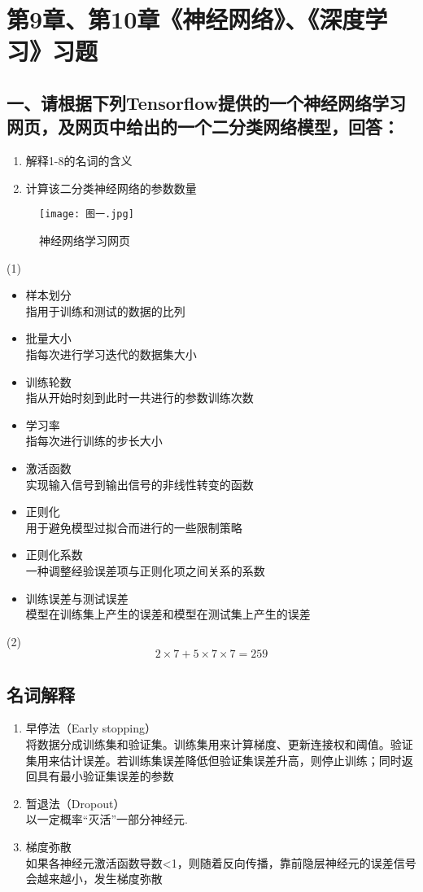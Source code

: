 \documentclass{ctexart}
\begin{document}
\section*{第9章、第10章《神经网络》、《深度学习》习题}
\subsection*{一、请根据下列Tensorflow提供的一个神经网络学习网页，及网页中给出的一个二分类网络模型，回答：}
\begin{enumerate}[(1)]
\item 解释1-8的名词的含义
\item 计算该二分类神经网络的参数数量
\end{enumerate}

\begin{figure}[H]
\centerline{\texttt{[image: 图一.jpg]}}
\caption{神经网络学习网页}
\end{figure}

(1)
\begin{itemize}
\item 样本划分\\
指用于训练和测试的数据的比列
\item 批量大小\\
指每次进行学习迭代的数据集大小
\item 训练轮数\\
指从开始时刻到此时一共进行的参数训练次数
\item 学习率\\
指每次进行训练的步长大小
\item 激活函数\\
实现输入信号到输出信号的非线性转变的函数
\item 正则化\\
用于避免模型过拟合而进行的一些限制策略
\item 正则化系数\\
一种调整经验误差项与正则化项之间关系的系数
\item 训练误差与测试误差\\
模型在训练集上产生的误差和模型在测试集上产生的误差
\end{itemize}
(2)
\begin{equation*}
2\times7+5\times7\times7=259
\end{equation*}


\subsection*{名词解释}
\begin{enumerate}[(1)]
\item 早停法（Early stopping）\\
将数据分成训练集和验证集。训练集用来计算梯度、更新连接权和阈值。验证集用来估计误差。若训练集误差降低但验证集误差升高，则停止训练；同时返回具有最小验证集误差的参数
\item 暂退法（Dropout）\\
以一定概率“灭活”一部分神经元.
\item 梯度弥散\\
如果各神经元激活函数导数<1，则随着反向传播，靠前隐层神经元的误差信号会越来越小，发生梯度弥散
\end{enumerate}
\vfill
\end{document}
